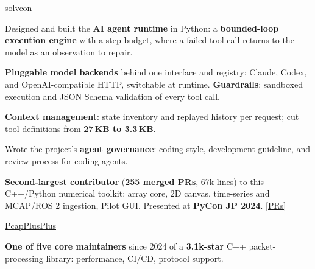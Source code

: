 
\vspace{-2mm}

\begin{cventries}



  \cventry
    {} %
    {\href{https://github.com/solvcon/solvcon}{solvcon}} %
    {} %
    {} %
    {
      \vspace{-3mm}
      \begin{cvitems} %
  \item {Designed and built the \textbf{AI agent runtime} in Python: a \textbf{bounded-loop execution engine} with a step budget, where a failed tool call returns to the model as an observation to repair.}
  \item {\textbf{Pluggable model backends} behind one interface and registry: Claude, Codex, and OpenAI-compatible HTTP, switchable at runtime. \textbf{Guardrails}: sandboxed execution and JSON Schema validation of every tool call.}
  \item {\textbf{Context management}: state inventory and replayed history per request; cut tool definitions from \textbf{27\,KB to 3.3\,KB}.}
  \item {Wrote the project's \textbf{agent governance}: coding style, development guideline, and review process for coding agents.}
  \item {\textbf{Second-largest contributor} (\textbf{255 merged PRs}, 67k lines) to this C++/Python numerical toolkit: array core, 2D canvas, time-series and MCAP/ROS 2 ingestion, Pilot GUI. Presented at \textbf{PyCon JP 2024}. \href{https://github.com/solvcon/solvcon/pulls?q=is:pr+is:merged+author:tigercosmos}{\textcolor{awesome}{[PRs]}}}
      \end{cvitems}
    }
    \vspace{2mm}

      \cventry
    {} %
    {\href{https://github.com/seladb/PcapPlusPlus/}{PcapPlusPlus}} %
    {} %
    {} %
    {
      \vspace{-3mm}
      \begin{cvitems} %
  \item {\textbf{One of five core maintainers} since 2024 of a \textbf{3.1k-star} C++ packet-processing library: performance, CI/CD, protocol support.}
      \end{cvitems}
    }

\end{cventries}
